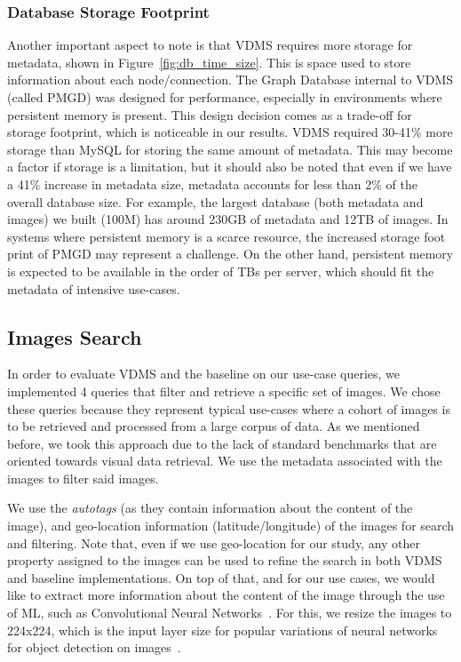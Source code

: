 \subsubsection{Database Storage Footprint}

Another important aspect to note is that
VDMS requires more storage for metadata, shown in Figure~\ref{fig:db_time_size}.
This is space used to store information about each node/connection.
The Graph Database internal to VDMS (called PMGD) was designed for performance,
especially in environments where persistent memory is present.
This design decision comes as a trade-off for storage footprint, which is
noticeable in our results.
VDMS required 30-41\% more storage than MySQL for storing the same amount
of metadata.
This may become a factor if storage is a limitation, but it should also be noted
that even if we have a 41\% increase in metadata size,
metadata accounts for less than 2\% of the overall database size.
For example, the largest database (both metadata and images) we built
(100M) has around 230GB of metadata and 12TB of images.
In systems where persistent memory is a scarce resource,
the increased storage foot print of PMGD may represent a challenge.
On the other hand, persistent memory is expected to be available 
in the order of TBs per server, which should fit the 
metadata of intensive use-cases\cite{IntelXPoint15}.


\subsection{Images Search}
\label{images}

In order to evaluate VDMS and the baseline on our use-case queries,
we implemented 4 queries that filter and retrieve a specific set of images.
We chose these queries because they represent typical use-cases where a
cohort of images is to be retrieved and processed from a large corpus of data.
As we mentioned before, we took this approach due to the lack of standard
benchmarks that are oriented towards visual data retrieval.
We use the metadata associated with the images to filter said images.

We use the \textit{autotags} (as they contain information about the content 
of the image), and geo-location information (latitude/longitude) 
of the images for search and filtering.
Note that, even if we use geo-location for our study, any other property 
assigned to the images can be used to refine the search 
in both VDMS and baseline implementations.
On top of that, and for our use cases, we would like to extract more information
about the content of the image through the use of ML,
such as Convolutional Neural Networks~\cite{cnn}.
For this, we resize the images to 224x224, which is the input layer size for
popular variations of neural networks for object detection on images~\cite{resnet}.

